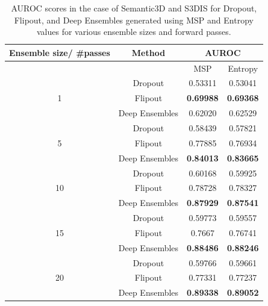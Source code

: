    \begin{table}[h!]
        \centering
        \begin{tabular}{cccc}
        \hline
        Ensemble size/ \#passes & Method               &  \multicolumn{2}{c}{AUROC}          \\ \hline
                                &                      &  MSP              & Entropy         \\ \hline
        \multirow{3}{*}{1}      & Dropout              & 0.53311          & 0.53041          \\
                                & Flipout              & \textbf{0.69988} & \textbf{0.69368} \\
                                & Deep Ensembles       & 0.62020          & 0.62529          \\ \hline
        \multirow{3}{*}{5}      & Dropout              & 0.58439          & 0.57821          \\
                                & Flipout              & 0.77885          & 0.76934          \\
                                & Deep Ensembles       & \textbf{0.84013} & \textbf{0.83665} \\ \hline
        \multirow{3}{*}{10}     & Dropout              & 0.60168          & 0.59925          \\
                                & Flipout              & 0.78728          & 0.78327          \\
                                & Deep Ensembles       & \textbf{0.87929} & \textbf{0.87541} \\ \hline
        \multirow{3}{*}{15}     & Dropout              & 0.59773          & 0.59557          \\
                                & Flipout              & 0.7667           & 0.76741          \\
                                & Deep Ensembles       & \textbf{0.88486} & \textbf{0.88246} \\ \hline
        \multirow{3}{*}{20}     & Dropout              & 0.59766          & 0.59661          \\
                                & Flipout              & 0.77331          & 0.77237          \\
                                & Deep Ensembles       & \textbf{0.89338} & \textbf{0.89052} \\ \hline
        \end{tabular}
        \caption{AUROC scores in the case of Semantic3D and S3DIS for Dropout, Flipout, and  Deep Ensembles generated using MSP and Entropy values for various ensemble sizes and forward passes.}
        \label{tab:sem3dvs3dis_auroc}
    \end{table}
